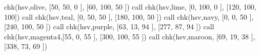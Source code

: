 \begin{DoxyDescription}
chk(\textquotesingle{}hsv\textquotesingle{},\textquotesingle{}olive\textquotesingle{}, \mbox{[}50, 50, 0 \mbox{]}, \mbox{[}60, 100, 50 \mbox{]}) call chk(\textquotesingle{}hsv\textquotesingle{},\textquotesingle{}lime\textquotesingle{}, \mbox{[}0, 100, 0 \mbox{]}, \mbox{[}120, 100, 100\mbox{]}) call chk(\textquotesingle{}hsv\textquotesingle{},\textquotesingle{}teal\textquotesingle{}, \mbox{[}0, 50, 50 \mbox{]}, \mbox{[}180, 100, 50 \mbox{]}) call chk(\textquotesingle{}hsv\textquotesingle{},\textquotesingle{}navy\textquotesingle{}, \mbox{[}0, 0, 50 \mbox{]}, \mbox{[}240, 100, 50 \mbox{]}) call chk(\textquotesingle{}hsv\textquotesingle{},\textquotesingle{}purple\textquotesingle{}, \mbox{[}63, 13, 94 \mbox{]}, \mbox{[}277, 87, 94 \mbox{]}) call chk(\textquotesingle{}hsv\textquotesingle{},\textquotesingle{}magenta4\textquotesingle{},\mbox{[}55, 0, 55 \mbox{]}, \mbox{[}300, 100, 55 \mbox{]}) call chk(\textquotesingle{}hsv\textquotesingle{},\textquotesingle{}maroon\textquotesingle{}, \mbox{[}69, 19, 38 \mbox{]}, \mbox{[}338, 73, 69 \mbox{]})


\end{DoxyDescription}
